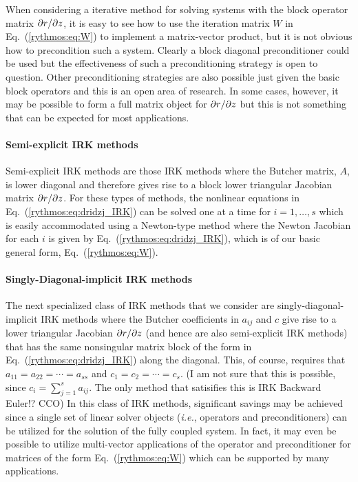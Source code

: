 When considering a iterative method for solving systems with the block
operator matrix $\partial r / \partial z$, it is easy to see how to use the iteration
matrix $W$ in Eq.~(\ref{rythmos:eq:W}) to implement a matrix-vector
product, but it is not obvious how to precondition such a system.
Clearly a block diagonal preconditioner could be used but the effectiveness
of such a preconditioning strategy is open to question. Other preconditioning
strategies are also possible just given the basic block operators
and this is an open area of research. In some cases, however, it may
be possible to form a full matrix object for $\partial r / \partial z$ but this
is not something that can be expected for most applications.


\paragraph{Semi-explicit IRK methods}

Semi-explicit IRK methods are those IRK methods where the Butcher
matrix, $A$, is lower diagonal and therefore gives rise to a block
lower triangular Jacobian matrix $\partial r / \partial z$. For these types of
methods, the nonlinear equations in Eq.~(\ref{rythmos:eq:dridzj_IRK})
can be solved one at a time for $i=1,\ldots,s$ which is easily accommodated
using a Newton-type method where the Newton Jacobian for each $i$
is given by Eq.~(\ref{rythmos:eq:dridzj_IRK}), which is of our basic
general form, Eq.~(\ref{rythmos:eq:W}).


\paragraph{Singly-Diagonal-implicit IRK methods}

The next specialized class of IRK methods that we consider are singly-diagonal-implicit
IRK methods where the Butcher coefficients in $a_{ij}$ and $c$ give
rise to a lower triangular Jacobian $\partial r / \partial z$ (and hence are also
semi-explicit IRK methods) that has the same nonsingular matrix block
of the form in Eq.~(\ref{rythmos:eq:dridzj_IRK}) along the diagonal.
This, of course, requires that $a_{11}=a_{22}=\cdots=a_{ss}$ and
$c_{1}=c_{2}=\cdots=c_{s}$. (I am not sure that this is possible,
since $c_{i}=\sum_{j=1}^{s}a_{ij}$. The only method that satisifies
this is IRK Backward Euler!? CCO) In this class of IRK methods, significant
savings may be achieved since a single set of linear solver objects
(\emph{i.e.}, operators and preconditioners) can be utilized for the
solution of the fully coupled system. In fact, it may even be possible
to utilize multi-vector applications of the operator and preconditioner
for matrices of the form Eq.~(\ref{rythmos:eq:W}) which can be supported
by many applications. 


